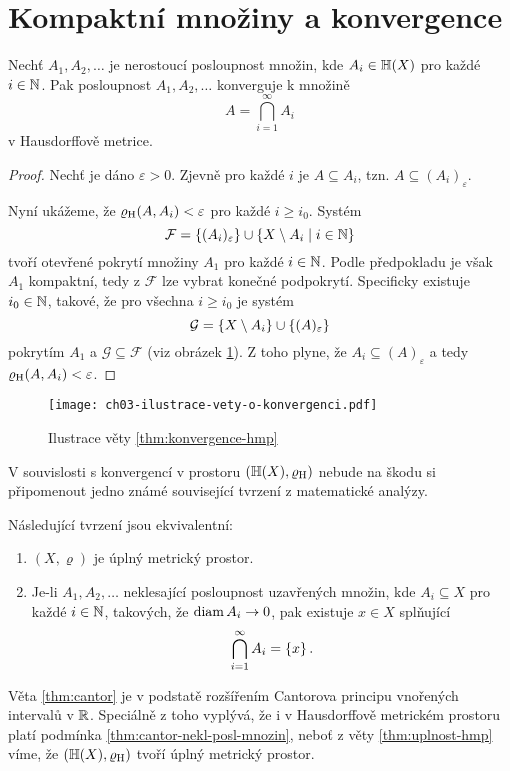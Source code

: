 \section{Kompaktní množiny a konvergence}\label{sec:konvergence-hmp}

\begin{theorem}\label{thm:konvergence-hmp}
    Nechť $A_1,A_2,\ldots$ je nerostoucí posloupnost množin, kde $A_i\in\mathbb{H}(X)$ pro každé $i\in\mathbb{N}$. Pak posloupnost $A_1,A_2,\ldots$ konverguje k množině
    \[A=\bigcap_{i=1}^\infty A_i\]
    v Hausdorffově metrice.
\end{theorem}
\begin{proof}
    Nechť je dáno $\varepsilon>0$. Zjevně pro každé $i$ je $A\subseteq A_i$, tzn. $A\subseteq(A_i)_\varepsilon$.
    
    Nyní ukážeme, že $\varrho_\textup{H}(A,A_i)<\varepsilon$ pro každé $i\geqslant i_0$. Systém
    \[\mathcal{F}=\left\{(A_i)_\varepsilon\right\}\cup\left\{X\setminus A_i\mid i\in\mathbb{N}\right\}\]
    tvoří otevřené pokrytí množiny $A_1$ pro každé $i\in\mathbb{N}$. Podle předpokladu je však $A_1$ kompaktní, tedy z $\mathcal{F}$ lze vybrat konečné podpokrytí. Specificky existuje $i_0\in\mathbb{N}$, takové, že pro všechna $i\geqslant i_0$ je systém
    \[\mathcal{G}=\left\{X\setminus A_i\right\}\cup\left\{(A)_\varepsilon\right\}\]
    pokrytím $A_1$ a $\mathcal{G}\subseteq\mathcal{F}$ (viz obrázek \ref{fig:konvergence-hmp}). Z toho plyne, že $A_i\subseteq (A)_\varepsilon$ a tedy $\varrho_\textup{H}(A,A_i)<\varepsilon$.
\end{proof}
\begin{figure}[h]
    \centering
    \texttt{[image: ch03-ilustrace-vety-o-konvergenci.pdf]}
    \caption{Ilustrace věty \ref{thm:konvergence-hmp}}
    \label{fig:konvergence-hmp}
\end{figure}

V souvislosti s konvergencí v prostoru $(\mathbb{H}(X),\varrho_\textup{H})$ nebude na škodu si připomenout jedno známé související tvrzení z matematické analýzy.
\begin{theorem}[Cantorova]\label{thm:cantor}
    Následující tvrzení jsou ekvivalentní:
    \begin{enumerate}[label=(\roman*)]
        \item\label{thm:cantor-uplnost} $(X,\varrho)$ je úplný metrický prostor.
        \item\label{thm:cantor-nekl-posl-mnozin} Je-li $A_1,A_2,\ldots$ neklesající posloupnost uzavřených množin, kde $A_i\subseteq X$ pro každé $i\in\mathbb{N}$, takových, že $\operatorname{diam}{A_i}\to 0$, pak existuje $x\in X$ splňující
        \[\bigcap_{i=1}^\infty A_i=\left\{x\right\}.\]
    \end{enumerate}
\end{theorem}
Věta \ref{thm:cantor} je v podstatě rozšířením Cantorova principu vnořených intervalů v $\mathbb{R}$. Speciálně z toho vyplývá, že i v Hausdorffově metrickém prostoru platí podmínka \ref{thm:cantor-nekl-posl-mnozin}, neboť z věty \ref{thm:uplnost-hmp} víme, že $(\mathbb{H}(X),\varrho_\textup{H})$ tvoří úplný metrický prostor.

